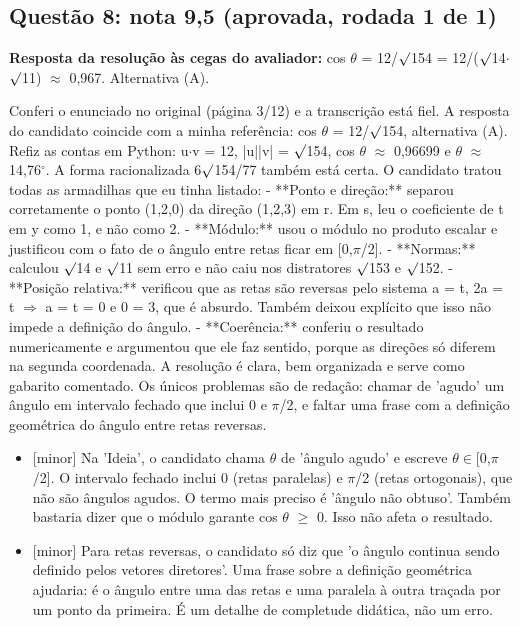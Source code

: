 \documentclass{article}%
\begin{document}
\subsection*{Questão 8: nota 9,5 (aprovada, rodada 1 de 1)}%
\textbf{Resposta da resolução às cegas do avaliador:} cos $\theta$ = 12/$\surd$154 = 12/($\surd$14$\cdot$$\surd$11) $\approx$ 0,967. Alternativa (A).\par %
Conferi o enunciado no original (página 3/12) e a transcrição está fiel. A resposta do candidato coincide com a minha referência: cos $\theta$ = 12/$\surd$154, alternativa (A). Refiz as contas em Python: u$\cdot$v = 12, |u||v| = $\surd$154, cos $\theta$ $\approx$ 0,96699 e $\theta$ $\approx$ 14,76$^\circ$. A forma racionalizada 6$\surd$154/77 também está certa.\newline%
\newline%
O candidato tratou todas as armadilhas que eu tinha listado:\newline%
{-} **Ponto e direção:** separou corretamente o ponto (1,2,0) da direção (1,2,3) em r. Em s, leu o coeficiente de t em y como 1, e não como 2.\newline%
{-} **Módulo:** usou o módulo no produto escalar e justificou com o fato de o ângulo entre retas ficar em {[}0,$\pi$/2{]}.\newline%
{-} **Normas:** calculou $\surd$14 e $\surd$11 sem erro e não caiu nos distratores $\surd$153 e $\surd$152.\newline%
{-} **Posição relativa:** verificou que as retas são reversas pelo sistema a = t, 2a = t $\Rightarrow$ a = t = 0 e 0 = 3, que é absurdo. Também deixou explícito que isso não impede a definição do ângulo.\newline%
{-} **Coerência:** conferiu o resultado numericamente e argumentou que ele faz sentido, porque as direções só diferem na segunda coordenada.\newline%
\newline%
A resolução é clara, bem organizada e serve como gabarito comentado. Os únicos problemas são de redação: chamar de 'agudo' um ângulo em intervalo fechado que inclui 0 e $\pi$/2, e faltar uma frase com a definição geométrica do ângulo entre retas reversas.%
\begin{itemize}%
\item%
{[}minor{]} Na 'Ideia', o candidato chama $\theta$ de 'ângulo agudo' e escreve $\theta$$\in${[}0,$\pi$/2{]}. O intervalo fechado inclui 0 (retas paralelas) e $\pi$/2 (retas ortogonais), que não são ângulos agudos. O termo mais preciso é 'ângulo não obtuso'. Também bastaria dizer que o módulo garante cos $\theta$ $\geq$ 0. Isso não afeta o resultado.%
\item%
{[}minor{]} Para retas reversas, o candidato só diz que 'o ângulo continua sendo definido pelos vetores diretores'. Uma frase sobre a definição geométrica ajudaria: é o ângulo entre uma das retas e uma paralela à outra traçada por um ponto da primeira. É um detalhe de completude didática, não um erro.%
\end{itemize}%
\end{document}
